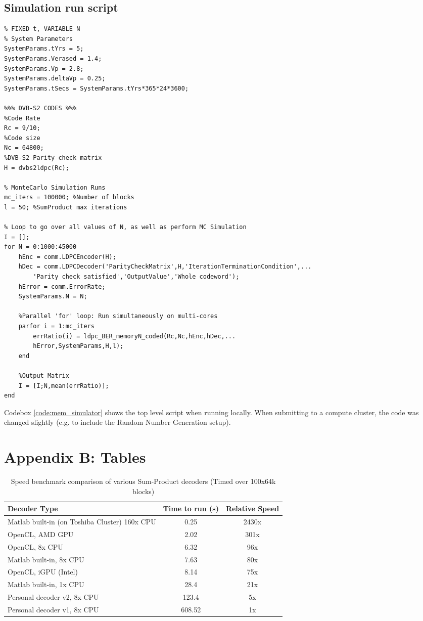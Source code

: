 \documentclass[11pt]{article}
\numberwithin{equation}{subsection}
\begin{document}
\subsection*{Simulation run script}
\begin{lstlisting}[style=Matlab-editor,caption = {Top-level Monte-Carlo simulation run script for the Memory channel},label=code:mem_simulator]
% LDPC Run Script for memory model
% FIXED t, VARIABLE N
% System Parameters
SystemParams.tYrs = 5;
SystemParams.Verased = 1.4;
SystemParams.Vp = 2.8;
SystemParams.deltaVp = 0.25;
SystemParams.tSecs = SystemParams.tYrs*365*24*3600;

%%% DVB-S2 CODES %%%
%Code Rate
Rc = 9/10;
%Code size
Nc = 64800;
%DVB-S2 Parity check matrix
H = dvbs2ldpc(Rc);

% MonteCarlo Simulation Runs
mc_iters = 100000; %Number of blocks
l = 50; %SumProduct max iterations

% Loop to go over all values of N, as well as perform MC Simulation
I = [];
for N = 0:1000:45000
    hEnc = comm.LDPCEncoder(H);
    hDec = comm.LDPCDecoder('ParityCheckMatrix',H,'IterationTerminationCondition',...
        'Parity check satisfied','OutputValue','Whole codeword');
    hError = comm.ErrorRate;
    SystemParams.N = N;

    %Parallel 'for' loop: Run simultaneously on multi-cores
    parfor i = 1:mc_iters
        errRatio(i) = ldpc_BER_memoryN_coded(Rc,Nc,hEnc,hDec,...
        hError,SystemParams,H,l);
    end

    %Output Matrix
    I = [I;N,mean(errRatio)];
end
\end{lstlisting}
\doublespacing
Codebox \ref{code:mem_simulator} shows the top level script when running locally. When submitting to a compute cluster, the code was changed slightly (e.g. to include the Random Number Generation setup).

{}
\section*{Appendix B: Tables}

\begin{table}[ht]
\caption{Speed benchmark comparison of various Sum-Product decoders (Timed over 100x64k blocks)}
\centering
\singlespacing
\begin{tabular}{| l | c | c |}
\hline
Decoder Type & Time to run (s) & Relative Speed \\
\hline
Matlab built-in (on Toshiba Cluster) 160x CPU & 0.25 & 2430x \\
OpenCL, AMD GPU & 2.02 & 301x \\
OpenCL, 8x CPU & 6.32 & 96x \\
Matlab built-in, 8x CPU & 7.63 & 80x \\
OpenCL, iGPU (Intel) & 8.14 & 75x \\
Matlab built-in, 1x CPU & 28.4 & 21x \\
Personal decoder v2, 8x CPU & 123.4 & 5x \\
Personal decoder v1, 8x CPU & 608.52 & 1x \\
\hline
\end{tabular}
\end{table}
\end{document}
